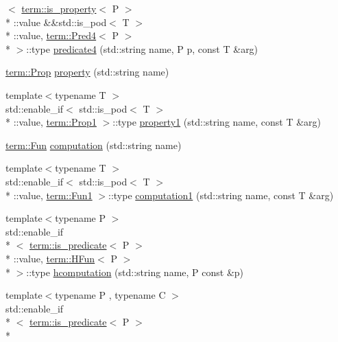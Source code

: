 \begin{DoxyCompactItemize}
$<$ \hyperlink{structpfq__lang_1_1term_1_1is__property}{term\-::is\-\_\-property}$<$ P $>$\\*
\-::value \&\&std\-::is\-\_\-pod$<$ T $>$\\*
\-::value, \hyperlink{structpfq__lang_1_1term_1_1Pred4}{term\-::\-Pred4}$<$ P $>$\\*
 $>$\-::type \hyperlink{namespacepfq__lang_a1a9064340f4197e3dd4109a849a224dc}{predicate4} (std\-::string name, P p, const T \&arg)
\item 
\hyperlink{structpfq__lang_1_1term_1_1Prop}{term\-::\-Prop} \hyperlink{namespacepfq__lang_ad70b40071ed0fd32c05ab8e82bbfec61}{property} (std\-::string name)
\item 
{\footnotesize template$<$typename T $>$ }\\std\-::enable\-\_\-if$<$ std\-::is\-\_\-pod$<$ T $>$\\*
\-::value, \hyperlink{structpfq__lang_1_1term_1_1Prop1}{term\-::\-Prop1} $>$\-::type \hyperlink{namespacepfq__lang_a3a4768b9f4e03b86943d332254cca27e}{property1} (std\-::string name, const T \&arg)
\item 
\hyperlink{structpfq__lang_1_1term_1_1Fun}{term\-::\-Fun} \hyperlink{namespacepfq__lang_ac0c16097c968653e72c609890dfb4c44}{computation} (std\-::string name)
\item 
{\footnotesize template$<$typename T $>$ }\\std\-::enable\-\_\-if$<$ std\-::is\-\_\-pod$<$ T $>$\\*
\-::value, \hyperlink{structpfq__lang_1_1term_1_1Fun1}{term\-::\-Fun1} $>$\-::type \hyperlink{namespacepfq__lang_a58e7e358fc7c95121f74d56c094b1627}{computation1} (std\-::string name, const T \&arg)
\item 
{\footnotesize template$<$typename P $>$ }\\std\-::enable\-\_\-if\\*
$<$ \hyperlink{structpfq__lang_1_1term_1_1is__predicate}{term\-::is\-\_\-predicate}$<$ P $>$\\*
\-::value, \hyperlink{structpfq__lang_1_1term_1_1HFun}{term\-::\-H\-Fun}$<$ P $>$\\*
 $>$\-::type \hyperlink{namespacepfq__lang_aabfd9ddf8afda95bb20b5668024eff31}{hcomputation} (std\-::string name, P const \&p)
\item 
{\footnotesize template$<$typename P , typename C $>$ }\\std\-::enable\-\_\-if\\*
$<$ \hyperlink{structpfq__lang_1_1term_1_1is__predicate}{term\-::is\-\_\-predicate}$<$ P $>$\\*

\end{DoxyCompactItemize}
